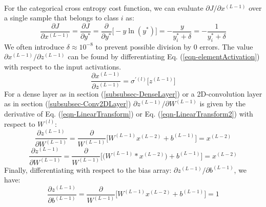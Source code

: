 \documentclass[12pt,letterpaper]{article}
\begin{document}
\paragraph*{}For the categorical cross entropy cost function, we can evaluate $\partial J / \partial x^{(L-1)}$ over a single sample that belongs to class $i$ as:
\begin{equation}
\label{eqn-CXELossDeriv}
\frac{\partial J}{\partial x^{(L-1)}} = \frac{\partial J}{\partial y^*} =
\frac{\partial}{\partial y^*}\Big[ -y \ln (y^*) \Big] = -\frac{y}{y^*_i + \delta} = -\frac{1}{y^*_i + \delta}
\end{equation}
We often introduce $\delta \approx 10^{-8}$ to prevent possible division by $0$ errors. The value $\partial x^{(L-1)} / \partial z^{(L-1)}$ can be found by differentiating Eq. (\ref{eqn-elementActivation}) with respect to the input activations.
\begin{equation}
\frac{\partial x^{(L-1)}}{\partial z^{(L-1)}} = \sigma^{'(l)} \big[ z^{(L-1)} \big]
\end{equation}
For a dense layer as in section (\ref{subsubsec-DenseLayer}) or a 2D-convolution layer as in section (\ref{subsubsec-Conv2DLayer}) $\partial z^{(L-1)} / \partial W^{(L-1)}$ is given by the derivative of Eq. (\ref{eqn-LinearTransform}) or Eq. (\ref{eqn-LinearTransform2}) with respect to $W^{(l)}$:
\begin{equation}
\frac{\partial z^{(L-1)}}{\partial W^{(L-1)}} = 
\frac{\partial}{W^{(L-1)}}\Big[ W^{(L-1)}x^{(L-2)} + b^{(L-1)}\Big] = x^{(L-2)}
\end{equation}
\begin{equation}
\frac{\partial z^{(L-1)}}{\partial W^{(L-1)}} = 
\frac{\partial}{W^{(L-1)}}\Big[ \big( W^{(L-1)} * x^{(L-2)} \big) + b^{(L-1)}\Big] = x^{(L-2)}
\end{equation}
Finally, differentiating with respect to the bias array: $\partial z^{(L-1)} / \partial b^{(L-1)}$, we have:
\begin{equation}
\frac{\partial z^{(L-1)}}{\partial b^{(L-1)}} = \frac{\partial}{W^{(L-1)}}\Big[ W^{(L-1)}x^{(L-2)} + b^{(L-1)}\Big] = 1
\end{equation}
\end{document}
